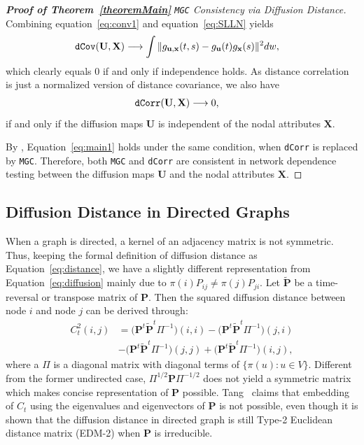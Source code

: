 \documentclass[11pt]{article}
\theoremstyle{definition}
\begin{document}
\begin{proof}[\textbf{Proof of Theorem~\ref{theoremMain}} \texttt{MGC} Consistency via Diffusion Distance]

Combining equation~\ref{eq:conv1} and equation~\ref{eq:SLLN} yields
\begin{eqnarray}
\mbox{\texttt{dCov}}(\mathbf{U},\mathbf{X}) &\longrightarrow \displaystyle\int{\|g_{\mathbf{u},\mathbf{x}}(t,s)-g_{\mathbf{u}}(t)g_{\mathbf{x}}(s)\|^{2}}dw,
\label{eq:main2}
\end{eqnarray}
which clearly equals $0$ if and only if independence holds. As distance correlation is just a normalized version of distance covariance, we also have 
\begin{eqnarray}
\mbox{\texttt{dCorr}}(\mathbf{U},\mathbf{X}) &\longrightarrow 0,
\label{eq:main1}
\end{eqnarray}
if and only if the diffusion maps $\mathbf{U}$ is independent of the nodal attributes $\mathbf{X}$.

By \cite{shen2016discovering}, Equation~\ref{eq:main1} holds under the same condition, when \texttt{dCorr} is replaced by \texttt{MGC}. Therefore, both \texttt{MGC} and \texttt{dCorr} are consistent in network dependence testing between the diffusion maps $\mathbf{U}$ and the nodal attributes $\mathbf{X}$.
\end{proof}

\subsection{Diffusion Distance in Directed Graphs}
\label{ssec:directed}

When a graph is directed, a kernel of an adjacency matrix is not symmetric. Thus, keeping the formal definition of diffusion distance as Equation~\ref{eq:distance}, we have a slightly different representation from Equation~\ref{eq:diffusion} mainly due to $\pi(i) P_{ij} \neq \pi(j) P_{ji}$. Let $\tilde{\mathbf{P}}$ be a time-reversal or transpose matrix of $\mathbf{P}$. Then the squared diffusion distance between node $i$ and node $j$ can be derived through:
\begin{equation}
\begin{split}
\label{eq:directed}
C^2_{t}(i,j)  & = \big( \mathbf{P}^{t} \tilde{ \mathbf{P} }^{t} \Pi^{-1} \big)(i,i) - \big( \mathbf{P}^{t} \tilde{ \mathbf{P} }^{t} \Pi^{-1} \big)(j,i) \\ & - \big( \mathbf{P}^{t} \tilde{ \mathbf{P} }^{t} \Pi^{-1} \big)(j,j) + \big( \mathbf{P}^{t} \tilde{ \mathbf{P}}^{t} \Pi^{-1} \big) (i,j),
\end{split}  
\end{equation}
where a $\Pi$ is a diagonal matrix with diagonal terms of $\{ \pi(u) : u \in V \}$. 
Different from the former undirected case, $\Pi^{1/2} \mathbf{P} \Pi^{-1/2}$ does not yield a symmetric matrix which makes concise representation of $\mathbf{P}$ possible. Tang~\cite{tang2010graph} claims that embedding of $C_{t}$ using the eigenvalues and eigenvectors of $\mathbf{P}$ is not possible, even though it is shown that the diffusion distance in directed graph is still Type-2 Euclidean distance matrix (EDM-2) when $\mathbf{P}$ is irreducible. 
\end{document}
